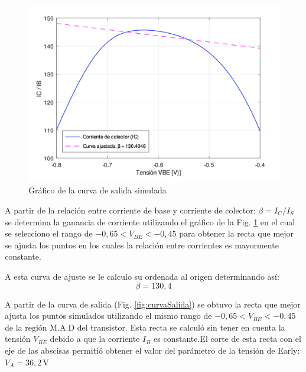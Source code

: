 \documentclass[10pt]{article}
\begin{document}
\begin{multicols}{2}
    
    \begin{figure}[H]
        \centering
        \includegraphics[width=0.9\linewidth]{curvaBeta.png}
        \caption{Gráfico de la curva de salida simulada}
        \label{fig:curvaBeta}
        \end{figure}

    \columnbreak
    
    \noindent
    A partir de la relación entre corriente de base y corriente de colector: $\beta = I_C / I_S$ se determina la ganancia de corriente utilizando el gráfico de la Fig. \ref{fig:curvaBeta} en el cual se selecciono el rango de $-0,65 < V_{BE} < -0,45$ para obtener la recta que mejor se ajusta los puntos en los cuales la relación entre corrientes es mayormente constante.
    
    A esta curva de ajuste se le calculo su ordenada al origen determinando así:
    \begin{equation*}
        \beta = 130,4 
    \end{equation*}
    \vspace{1cm}
\end{multicols}

A partir de la curva de salida (Fig. \ref{fig:curvaSalida}) se obtuvo la recta que mejor ajusta los puntos simulados utilizando el mismo rango de $-0,65 < V_{BE} < -0,45$ de la región M.A.D del transistor. Esta recta se calculó sin tener en cuenta la tensión $V_{BE}$ debido a que la corriente $I_B$ es constante.El corte de esta recta con el eje de las abscisas permitió obtener el valor del parámetro de la tensión de Early: \; $V_A = 36,2 \, \mathrm{V}$
\end{document}
